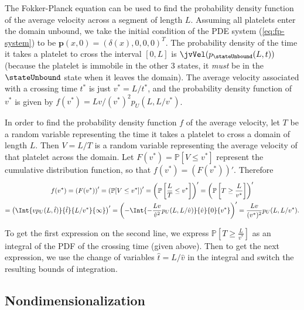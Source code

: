 The Fokker-Planck equation can be used to find the probability density
function of the average velocity across a segment of length
$L$. Assuming all platelets enter the domain unbound, we take the
initial condition of the PDE system (\ref{eq:fp-system}) to be
$\mathbf{p}(x, 0) = (\delta(x), 0, 0, 0)^T$. The probability density
of the time it takes a platelet to cross the interval $[0, L]$ is
$\jvVel (p_{\stateUnbound}(L,t))$ (because the platelet is immobile in
the other 3 states, it \emph{must} be in the $\stateUnbound$ state
when it leaves the domain). The average velocity associated with a
crossing time $t^*$ is just $v^* = L/t^*$, and the probability density
function of $v^*$ is given by $f(v^*) = Lv/(v^*)^2 p_U(L,
L/v^*)$.

In order to find the probability density function $f$ of the average
velocity, let $T$ be a random variable representing the time it takes
a platelet to cross a domain of length $L$. Then $V = L/T$ is a random
variable representing the average velocity of that platelet across the
domain. Let $F(v^*) = \mathbb{P}[V \leq v^*]$ represent the cumulative
distribution function, so that
$f(v^*) = \left(F(v^*)\right)'$. Therefore
\begin{multline*}
  f(v^*) = \left(F(v^*)\right)' = \left(\mathbb{P}[V \leq v^*]\right)'
  = \left(\mathbb{P}\left[\frac{L}{T} \leq v^*\right]\right)' =
  \left(\mathbb{P}\left[T \geq \frac{L}{v^*} \right]\right)' \\
  = \left(\Int{vp_U(L, \hat{t})}{\hat{t}}{L/v^*}{\infty}\right)' =
  \left(-\Int{-\frac{Lv}{\hat{v}^2} p_U(L,
      L/\hat{v})}{\hat{v}}{0}{v^*}\right)' = \frac{Lv}{(v^*)^2} p_U(L,
  L/v^*).
\end{multline*}

To get the first expression on the second line, we express
$\mathbb{P}[T \geq \frac{L}{v^*}]$ as an integral of the PDF of the
crossing time (given above). Then to get the next expression, we use
the change of variables $\hat{t} = L / \hat{v}$ in the integral and
switch the resulting bounds of integration.

\subsection{Nondimensionalization}
\label{sec:nondim}

